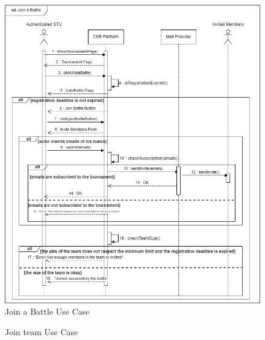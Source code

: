 \begin{figure}[H]
    \centering
    \includegraphics[width=1\textwidth]{images/sequence_diagrams/ClassDiagram-UC7-SequenceDiagram.png}
    \caption{Join a Battle Use Case}
    \label{fig:uc7}
\end{figure}
\begin{figure}[H]
    \centering
    \caption{\color{red} Join team Use Case}
    \label{fig:uc8}
\end{figure}
